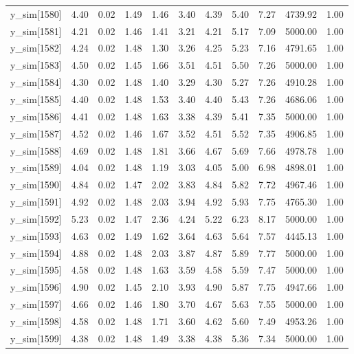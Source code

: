 \begin{table}[ht]
\begin{tabular}{rrrrrrrrrrr}
  y\_sim[1580] & 4.40 & 0.02 & 1.49 & 1.46 & 3.40 & 4.39 & 5.40 & 7.27 & 4739.92 & 1.00 \\ 
  y\_sim[1581] & 4.21 & 0.02 & 1.46 & 1.41 & 3.21 & 4.21 & 5.17 & 7.09 & 5000.00 & 1.00 \\ 
  y\_sim[1582] & 4.24 & 0.02 & 1.48 & 1.30 & 3.26 & 4.25 & 5.23 & 7.16 & 4791.65 & 1.00 \\ 
  y\_sim[1583] & 4.50 & 0.02 & 1.45 & 1.66 & 3.51 & 4.51 & 5.50 & 7.26 & 5000.00 & 1.00 \\ 
  y\_sim[1584] & 4.30 & 0.02 & 1.48 & 1.40 & 3.29 & 4.30 & 5.27 & 7.26 & 4910.28 & 1.00 \\ 
  y\_sim[1585] & 4.40 & 0.02 & 1.48 & 1.53 & 3.40 & 4.40 & 5.43 & 7.26 & 4686.06 & 1.00 \\ 
  y\_sim[1586] & 4.41 & 0.02 & 1.48 & 1.63 & 3.38 & 4.39 & 5.41 & 7.35 & 5000.00 & 1.00 \\ 
  y\_sim[1587] & 4.52 & 0.02 & 1.46 & 1.67 & 3.52 & 4.51 & 5.52 & 7.35 & 4906.85 & 1.00 \\ 
  y\_sim[1588] & 4.69 & 0.02 & 1.48 & 1.81 & 3.66 & 4.67 & 5.69 & 7.66 & 4978.78 & 1.00 \\ 
  y\_sim[1589] & 4.04 & 0.02 & 1.48 & 1.19 & 3.03 & 4.05 & 5.00 & 6.98 & 4898.01 & 1.00 \\ 
  y\_sim[1590] & 4.84 & 0.02 & 1.47 & 2.02 & 3.83 & 4.84 & 5.82 & 7.72 & 4967.46 & 1.00 \\ 
  y\_sim[1591] & 4.92 & 0.02 & 1.48 & 2.03 & 3.94 & 4.92 & 5.93 & 7.75 & 4765.30 & 1.00 \\ 
  y\_sim[1592] & 5.23 & 0.02 & 1.47 & 2.36 & 4.24 & 5.22 & 6.23 & 8.17 & 5000.00 & 1.00 \\ 
  y\_sim[1593] & 4.63 & 0.02 & 1.49 & 1.62 & 3.64 & 4.63 & 5.64 & 7.57 & 4445.13 & 1.00 \\ 
  y\_sim[1594] & 4.88 & 0.02 & 1.48 & 2.03 & 3.87 & 4.87 & 5.89 & 7.77 & 5000.00 & 1.00 \\ 
  y\_sim[1595] & 4.58 & 0.02 & 1.48 & 1.63 & 3.59 & 4.58 & 5.59 & 7.47 & 5000.00 & 1.00 \\ 
  y\_sim[1596] & 4.90 & 0.02 & 1.45 & 2.10 & 3.93 & 4.90 & 5.87 & 7.75 & 4947.66 & 1.00 \\ 
  y\_sim[1597] & 4.66 & 0.02 & 1.46 & 1.80 & 3.70 & 4.67 & 5.63 & 7.55 & 5000.00 & 1.00 \\ 
  y\_sim[1598] & 4.58 & 0.02 & 1.48 & 1.71 & 3.60 & 4.62 & 5.60 & 7.49 & 4953.26 & 1.00 \\ 
  y\_sim[1599] & 4.38 & 0.02 & 1.48 & 1.49 & 3.38 & 4.38 & 5.36 & 7.34 & 5000.00 & 1.00 \\ 

\end{tabular}
\end{table}
